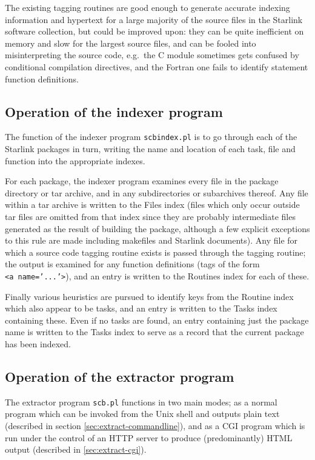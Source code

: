 \documentclass[twoside,11pt]{article}
\newcommand{\xlabel}[1]{}
\renewcommand{\_}{\texttt{\symbol{95}}}
\begin{document}
The existing tagging routines are good enough to generate 
accurate indexing information and hypertext 
for a large majority of the source files in the
Starlink software collection, but could be improved upon:
they can be quite inefficient on memory and slow
for the largest source files, and can be fooled into misinterpreting
the source code, e.g.\ the C module sometimes gets confused by conditional
compilation directives, and the Fortran one fails to identify
statement function definitions.



\subsection{\xlabel{sec:internals-indexer}\label{sec:internals-indexer}Operation of the indexer program}

The function of the indexer program {\tt scbindex.pl} 
is to go through
each of the Starlink packages in turn, writing the name and 
location of each task, file and function into the appropriate 
indexes.

For each package, the indexer program examines 
every file in the package directory or tar archive, 
and in any subdirectories or subarchives thereof.
Any file within a tar archive 
is written to the Files index
(files which only occur outside tar files are omitted
from that index since they are probably intermediate files 
generated as the result of building the package, although
a few explicit exceptions to this rule are made 
including makefiles and Starlink documents). 
Any file for which a
source code tagging routine exists
is passed through the tagging routine;
the output is examined for any function definitions 
(tags of the form {\tt <a~name='...'>}), 
and an entry is written to the Routines index for each of these.

Finally various heuristics are pursued to identify
keys from the Routine index which also appear to be tasks, 
and an entry is written to the Tasks index containing these.
Even if no tasks are found, an entry containing just the package
name is written to the Tasks index to serve as a record that 
the current package has been indexed.


\subsection{\xlabel{sec:internals-extractor}\label{sec:internals-extractor}Operation of the extractor program}

The extractor program {\tt scb.pl} functions in two main modes;
as a normal program which can be invoked from the Unix shell and
outputs plain text (described in section \ref{sec:extract-commandline}),
and as a CGI program which is run under the control of an HTTP server
to produce (predominantly) HTML output (described in \ref{sec:extract-cgi}).
\end{document}
